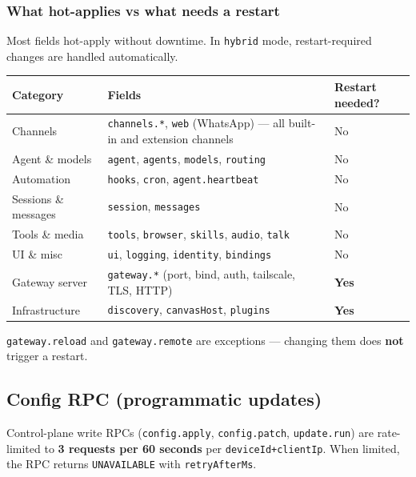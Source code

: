 \subsubsection{What hot-applies vs what needs a restart}


Most fields hot-apply without downtime. In \texttt{hybrid} mode, restart-required changes are handled automatically.


\begin{table}[h]
\centering
\small
\begin{tabular}{|l|l|l|}
\hline
Category & Fields & Restart needed? \\
\hline
Channels & \texttt{channels.*}, \texttt{web} (WhatsApp) — all built-in and extension channels & No \\
\hline
Agent \& models & \texttt{agent}, \texttt{agents}, \texttt{models}, \texttt{routing} & No \\
\hline
Automation & \texttt{hooks}, \texttt{cron}, \texttt{agent.heartbeat} & No \\
\hline
Sessions \& messages & \texttt{session}, \texttt{messages} & No \\
\hline
Tools \& media & \texttt{tools}, \texttt{browser}, \texttt{skills}, \texttt{audio}, \texttt{talk} & No \\
\hline
UI \& misc & \texttt{ui}, \texttt{logging}, \texttt{identity}, \texttt{bindings} & No \\
\hline
Gateway server & \texttt{gateway.*} (port, bind, auth, tailscale, TLS, HTTP) & \textbf{Yes} \\
\hline
Infrastructure & \texttt{discovery}, \texttt{canvasHost}, \texttt{plugins} & \textbf{Yes} \\
\hline
\end{tabular}
\end{table}



\texttt{gateway.reload} and \texttt{gateway.remote} are exceptions — changing them does \textbf{not} trigger a restart.

\subsection{Config RPC (programmatic updates)}


Control-plane write RPCs (\texttt{config.apply}, \texttt{config.patch}, \texttt{update.run}) are rate-limited to \textbf{3 requests per 60 seconds} per \texttt{deviceId+clientIp}. When limited, the RPC returns \texttt{UNAVAILABLE} with \texttt{retryAfterMs}.

